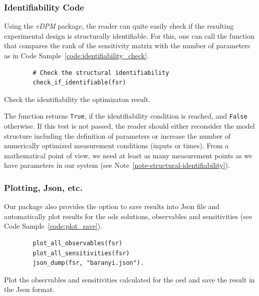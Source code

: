 \documentclass[graybox]{svmult}
\begin{document}
\subsubsection{Identifiability Code}
Using the {\it eDPM} package, the reader can quite easily check if the resulting experimental design is structurally identifiable.
For this, one can call the function that compares the rank of the sensitivity matrix with the number of parameters as in Code Sample~\ref{code:identifiability_check}.
\begin{code}[h]
    \begin{verbatim}
        # Check the structural identifiability
        check_if_identifiable(fsr)
    \end{verbatim}
\caption{Check the identifiability the optimizaton result.}
\label{code:identifiability_check}
\end{code}
The function returns \texttt{True}, if the identifiability condition is reached, and \texttt{False} otherwise.
If this test is not passed, the reader should either reconsider the model structure including the definition of parameters or increase the number of numerically optimized measurement conditions (inputs or times).
From a mathematical point of view, we need at least as many measurement points as we have parameters in our system (see Note~\ref{note-structural-identifiability}).
%
\subsubsection{Plotting, Json, etc.}
Our package also provides the option to save results into Json file and automatically plot results for the ode solutions, observables and sensitivities (see Code Sample~\ref{code:plot_save}).
\begin{code}[h]
    \begin{verbatim}
        plot_all_observables(fsr)
        plot_all_sensitivities(fsr)
        json_dump(fsr, "baranyi.json").
    \end{verbatim}
\caption{Plot the observables and sensitivities calculated for the \ac{oed} and save the result in the Json format.}
\label{code:plot_save}
\end{code}
%
%
%
\end{document}
